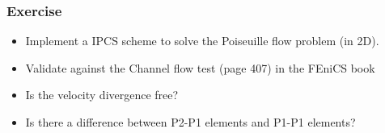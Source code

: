 \begin{frame}
\frametitle{Exercise}
\begin{itemize}
\item 
Implement a IPCS scheme to solve the Poiseuille flow problem (in 2D). 
\item 
Validate against the Channel flow test (page 407) in the FEniCS book
\item 
Is the velocity divergence free? 
\item 
Is there a difference between P2-P1 elements and P1-P1 elements? 
\end{itemize}
\end{frame}
